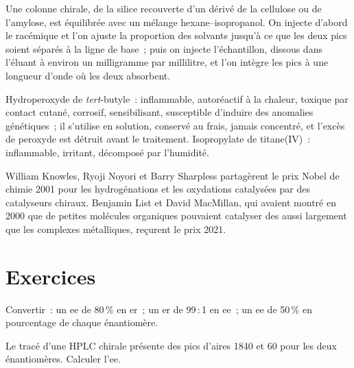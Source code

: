 \begin{inthelab}
Une colonne chirale, de la silice recouverte d'un dérivé de la cellulose ou
de l'amylose, est équilibrée avec un mélange hexane--isopropanol. On
injecte d'abord le racémique et l'on ajuste la proportion des solvants
jusqu'à ce que les deux pics soient séparés à la ligne de base~; puis on
injecte l'échantillon, dissous dans l'éluant à environ un milligramme par
millilitre, et l'on intègre les pics à une longueur d'onde où les deux
absorbent.
\end{inthelab}

\begin{safety}{}
Hydroperoxyde de \textit{tert}-butyle~: inflammable, autoréactif à la chaleur, toxique par
contact cutané, corrosif, sensibilisant, susceptible d'induire des
anomalies génétiques~; il s'utilise en solution, conservé au frais, jamais
concentré, et l'excès de peroxyde est détruit avant le traitement.
Isopropylate de titane(IV)~: inflammable, irritant, décomposé par
l'humidité.
\end{safety}

\begin{history}
William Knowles, Ryoji Noyori et Barry Sharpless partagèrent le prix Nobel
de chimie 2001 pour les hydrogénations et les oxydations catalysées par des
catalyseurs chiraux. Benjamin List et David MacMillan, qui avaient montré
en 2000 que de petites molécules organiques pouvaient catalyser des
 aussi largement que les complexes
métalliques, reçurent le prix 2021.
\end{history}

\section{Exercices}

\begin{exercise}[$\star$]\label{exo:b3:asymmetric-synthesis:1}
Convertir~: un ee de 80\,\% en er~; un er de 99\,:\,1 en ee~; un ee de 50\,\%
en pourcentage de chaque énantiomère.
\end{exercise}

\begin{exercise}[$\star$]\label{exo:b3:asymmetric-synthesis:2}
Le tracé d'une HPLC chirale présente des pics d'aires 1840 et 60 pour les
deux énantiomères. Calculer l'ee.
\end{exercise}

